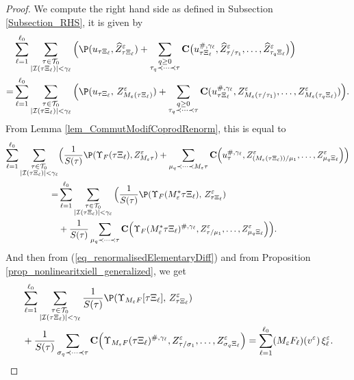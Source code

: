\documentclass[11pt]{preprint}
\newcommand{\mcI}{\mathcal{I}}
\newcommand{\mcT}{\mathcal{T}}
\def\eps{\varepsilon}
\let\eps\varepsilon
\def\eqref#1{(\ref{#1})}
\newcommand{\bfC}{{\bf C}}
\begin{document}
	\begin{proof}
		We compute the right hand side as defined in Subsection \ref{Subsection_RHS}, it is given by 
		\begin{align*}
			& \sum_{\ell=1}^{\ell_0}\sum_{\substack{\tau\in\mcT_{0} \\ |\mcI(\tau\Xi_\ell)|<\gamma_\ell }}\Big( \P(u_{\tau\Xi_\ell}, \widehat Z_{\tau\Xi_\ell}^\eps ) + \sum_{\substack{q\geq 0 \\ \tau_q\prec\dots\prec\tau}} \bfC\big(u_{\tau\Xi_\ell}^{\#,\gamma_\ell},\widehat Z_{\tau/\tau_1}^\eps,\dots, \widehat Z_{\tau_q\Xi_\ell}^\eps \big)\Big) 
			\\
			=& \sum_{\ell=1}^{\ell_0}\sum_{\substack{\tau\in\mcT_{0} \\ |\mcI(\tau\Xi_\ell)|<\gamma_\ell }}\Big( \P(u_{\tau\Xi_\ell},\, Z_{M_\eps(\tau\Xi_\ell)}^\eps) + \sum_{\substack{q\geq 0 \\ \tau_q\prec\dots\prec\tau}} \bfC (u_{\tau\Xi_\ell}^{\#,\gamma_\ell},Z_{M_\eps(\tau/\tau_1)}^\eps,\dots,Z_{M_\eps(\tau_q\Xi_\ell)}^\eps)\Big).
		\end{align*}
		From Lemma \ref{lem_CommutModifCoprodRenorm}, this is equal to 
		\begin{align*}
			\sum_{\ell=1}^{\ell_0}\sum_{\substack{\tau\in\mcT_{0} \\ |\mcI(\tau\Xi_\ell)|<\gamma_\ell }} & \Big(\frac{1}{S(\tau)} \P(\Upsilon_F(\tau\Xi_\ell), Z_{M_\eps\tau}^\eps) + \sum_{\mu_q\prec\dots\prec M_\eps\tau}\bfC\Big(u_\tau^{\#,\gamma_\ell},Z_{(M_\eps(\tau\Xi_\ell))/\mu_1}^\eps,\dots,Z_{\mu_q\Xi_\ell}^\eps\Big)\Big)
			\\
			=&\sum_{\ell=1}^{\ell_0}\sum_{\substack{\tau\in\mcT_{0} \\ |\mcI(\tau\Xi_\ell)|<\gamma_\ell }} \Big( \frac{1}{S(\tau)} \P(\Upsilon_F(M_{\eps}^* \tau\Xi_\ell), \, Z_{\tau\Xi_\ell}^\eps )
			\\& + \frac{1}{S(\tau)} \sum_{\mu_q\prec\dots\prec \tau}\bfC\Big(\Upsilon_{ F}(M_{\eps}^*\tau\Xi_\ell)^{\#,\gamma_\ell},Z_{\tau/\mu_1}^\eps,\dots,Z_{\mu_q\Xi_\ell}^\eps\Big)\Big).
		\end{align*}
		And then from  \eqref{eq_renormalisedElementaryDiff} and from Proposition \ref{prop_nonlinearitxiell_generalized}, we get 
		\begin{align*}
			&\sum_{\ell=1}^{\ell_0}\sum_{\substack{\tau\in\mcT_{0} \\ |\mcI(\tau\Xi_\ell)|<\gamma_\ell }}  \frac{1}{S(\tau)}\P(  \Upsilon_{M_\eps F}[\tau\Xi_\ell]  ,\, Z_{\tau\Xi_\ell}^\eps) \\ & + \frac{1}{S(\tau)}\sum_{\sigma_q\prec\dots\prec \tau}\bfC\Big(\Upsilon_{M_\eps F}(\tau\Xi_\ell)^{\#,\gamma_\ell},Z_{\tau/\sigma_1}^\eps,\dots,Z_{\sigma_q\Xi_\ell}^\eps\Big)
			= \sum_{\ell=1}^{\ell_0} (M_\eps F_\ell)(v^\eps)\, \xi_\ell^\eps.
		\end{align*}
	\end{proof}
	
\end{document}
